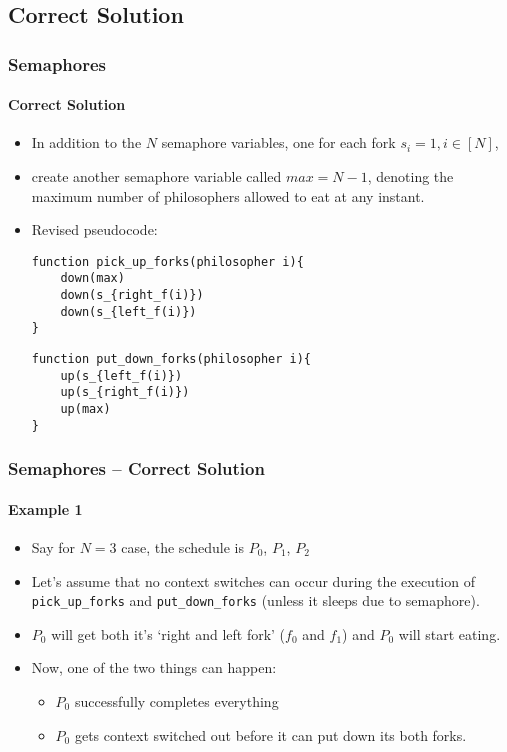 \documentclass[aspectratio=169, handout, 10pt]{beamer}
\theoremstyle{example}
\begin{document}
\subsection{Correct Solution}
\begin{frame}[fragile]\frametitle{Semaphores}\framesubtitle{Correct Solution}
  \begin{itemize}
  \pause\item In addition to the $N$ semaphore variables, one for each fork $s_i = 1, i \in [N]$,
  \pause\item create another semaphore variable called $max = N-1$, denoting the maximum number of philosophers allowed to eat at any instant.
  \pause\item Revised pseudocode:
\begin{Verbatim}[frame=single]
function pick_up_forks(philosopher i){
    down(max)
    down(s_{right_f(i)})
    down(s_{left_f(i)})
}
\end{Verbatim}
\begin{Verbatim}[frame=single]
function put_down_forks(philosopher i){
    up(s_{left_f(i)})
    up(s_{right_f(i)})
    up(max)
}
\end{Verbatim}
  \end{itemize}
\end{frame}
\begin{frame}[fragile]\frametitle{Semaphores -- Correct Solution}\framesubtitle{Example 1}
  \begin{example}
  \begin{itemize}
  \pause\item Say for $N=3$ case, the schedule is $P_0$, $P_1$, $P_2$
  \pause\item Let's assume that no context switches can occur during the execution of \verb!pick_up_forks! and \verb!put_down_forks! (unless it sleeps due to semaphore).
  \pause\item $P_0$ will get both it's `right and left fork' ($f_0$ and $f_1$) and $P_0$ will start eating.
  \pause\item Now, one of the two things can happen:
  \begin{itemize}
      \item $P_0$ successfully completes everything 
      \item $P_0$ gets context switched out before it can put down its both forks.
  \end{itemize}
  \end{itemize}
  \end{example}
\end{frame}
\end{document}
